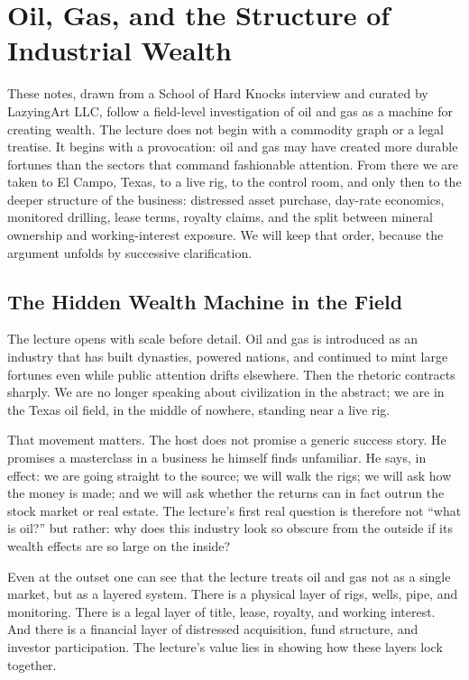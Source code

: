 \chapter{Oil, Gas, and the Structure of Industrial Wealth}

These notes, drawn from a School of Hard Knocks interview and curated by LazyingArt LLC, follow a field-level investigation of oil and gas as a machine for creating wealth. The lecture does not begin with a commodity graph or a legal treatise. It begins with a provocation: oil and gas may have created more durable fortunes than the sectors that command fashionable attention. From there we are taken to El Campo, Texas, to a live rig, to the control room, and only then to the deeper structure of the business: distressed asset purchase, day-rate economics, monitored drilling, lease terms, royalty claims, and the split between mineral ownership and working-interest exposure. We will keep that order, because the argument unfolds by successive clarification.

\section{The Hidden Wealth Machine in the Field}

The lecture opens with scale before detail. Oil and gas is introduced as an industry that has built dynasties, powered nations, and continued to mint large fortunes even while public attention drifts elsewhere. Then the rhetoric contracts sharply. We are no longer speaking about civilization in the abstract; we are in the Texas oil field, in the middle of nowhere, standing near a live rig.

That movement matters. The host does not promise a generic success story. He promises a masterclass in a business he himself finds unfamiliar. He says, in effect: we are going straight to the source; we will walk the rigs; we will ask how the money is made; and we will ask whether the returns can in fact outrun the stock market or real estate. The lecture's first real question is therefore not ``what is oil?'' but rather: why does this industry look so obscure from the outside if its wealth effects are so large on the inside?

Even at the outset one can see that the lecture treats oil and gas not as a single market, but as a layered system. There is a physical layer of rigs, wells, pipe, and monitoring. There is a legal layer of title, lease, royalty, and working interest. And there is a financial layer of distressed acquisition, fund structure, and investor participation. The lecture's value lies in showing how these layers lock together.

